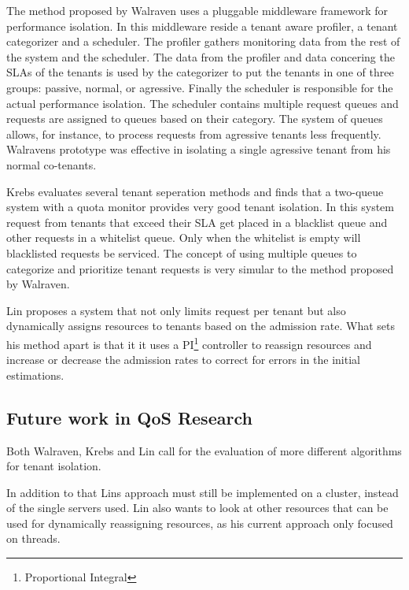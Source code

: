 The method proposed by Walraven uses a pluggable middleware framework for performance isolation.
In this middleware reside a tenant aware profiler, a tenant categorizer and a scheduler. 
The profiler gathers monitoring data from the rest of the system and the scheduler.
The data from the profiler and data concering the SLAs of the tenants is used by the categorizer to put the tenants in one of three groups: passive, normal, or agressive.
Finally the scheduler is responsible for the actual performance isolation.
The scheduler contains multiple request queues and requests are assigned to queues based on their category.
The system of queues allows, for instance, to process requests from agressive tenants less frequently.
Walravens prototype was effective in isolating a single agressive tenant from his normal co-tenants.

Krebs evaluates several tenant seperation methods and finds that a two-queue system with a quota monitor provides very good tenant isolation.
In this system request from tenants that exceed their SLA get placed in a blacklist queue and other requests in a whitelist queue. 
Only when the whitelist is empty will blacklisted requests be serviced.
The concept of using multiple queues to categorize and prioritize tenant requests is very simular to the method proposed by Walraven.

Lin proposes a system that not only limits request per tenant but also dynamically assigns resources to tenants based on the admission rate.
What sets his method apart is that it it uses a PI\footnote{Proportional Integral} controller to reassign resources and increase or decrease the admission rates to correct for errors in the initial estimations.

\subsection{Future work in QoS Research}
Both Walraven, Krebs and Lin call for the evaluation of more different algorithms for tenant isolation.

In addition to that Lins approach must still be implemented on a cluster, instead of the single servers used. Lin also wants to look at other resources that can be used for dynamically reassigning resources, as his current approach only focused on threads.

